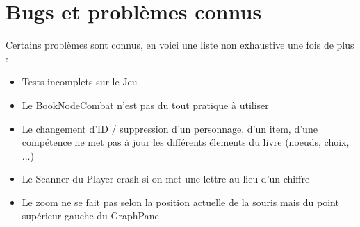 	\section{Bugs et problèmes connus}

		Certains problèmes sont connus, en voici une liste non exhaustive une fois de plus :

		\begin{itemize}
			\item{Tests incomplets sur le Jeu}
			\item{Le BookNodeCombat n'est pas du tout pratique à utiliser}
			\item{Le changement d'ID / suppression d'un personnage, d'un item, d'une compétence ne met pas à jour les différents élements du livre (noeuds, choix, ...)}
			\item{Le Scanner du Player crash si on met une lettre au lieu d'un chiffre}
			\item{Le zoom ne se fait pas selon la position actuelle de la souris mais du point supérieur gauche du GraphPane}
		\end{itemize}
